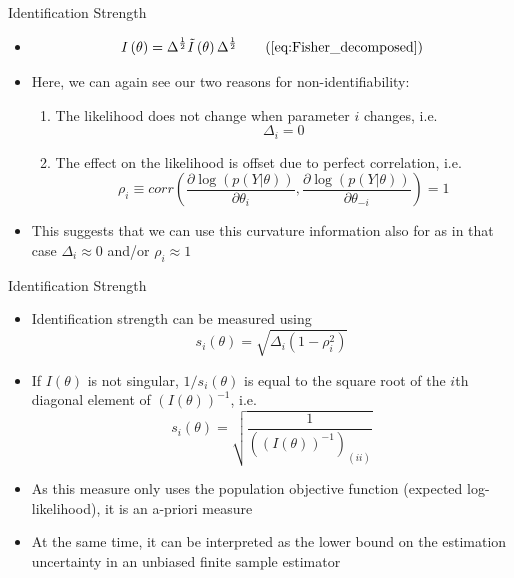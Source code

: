 \begin{frame}{Identification Strength}
\begin{itemize}
    \item[]
    \begin{equation}
    I\left( \theta  \right) = {\Delta ^{\frac{1}{2}}}\tilde I\left( \theta  \right){\Delta ^{\frac{1}{2}}} \tag{\ref{eq:Fisher_decomposed}}
    \end{equation}
    \item Here, we can again see our two reasons for non-identifiability:
    \begin{enumerate}
      \item The likelihood does not change when parameter $i$ changes, i.e.\
      \begin{equation}
      \Delta_i=0
      \end{equation}

      \item The effect on the likelihood is offset due to perfect correlation, i.e.\
      \begin{equation}
      {\rho _i} \equiv corr\left( {\frac{{\partial \log \left( {p\left( {Y|\theta } \right)} \right)}}{{\partial {\theta _i}}},\frac{{\partial \log \left( {p\left( {Y|\theta } \right)} \right)}}{{\partial {\theta _{ - i}}}}} \right) = 1
      \end{equation}
    \end{enumerate}
    \item This suggests that we can use this curvature information also for  as in that case $\Delta_i\approx 0$ and/or $\rho_i\approx1$
\end{itemize}
\end{frame}

\begin{frame}{Identification Strength}
\begin{itemize}
    \item Identification strength can be measured using
    \begin{equation}
    {s_i}\left( \theta  \right) = \sqrt {{\Delta _i}\left( {1 - \rho _i^2} \right)}
    \end{equation}
    \item If $I(\theta)$ is not singular, $1/{s_i}\left( \theta  \right)$ is equal to the square root of the $i$th diagonal element of $(I(\theta))^{-1}$, i.e.
    \begin{equation}
    {s_i}\left( \theta  \right)=\sqrt{\frac{1}{\left(\left(I(\theta)\right)^{-1}\right)_{(ii)}}} \label{eq:sensitivity}
    \end{equation}
    \item As this measure only uses the population objective function (expected log-likelihood), it is an a-priori measure
    \item At the same time, it can be interpreted as the lower bound on the estimation uncertainty in an unbiased finite sample estimator
\end{itemize}
\end{frame}

